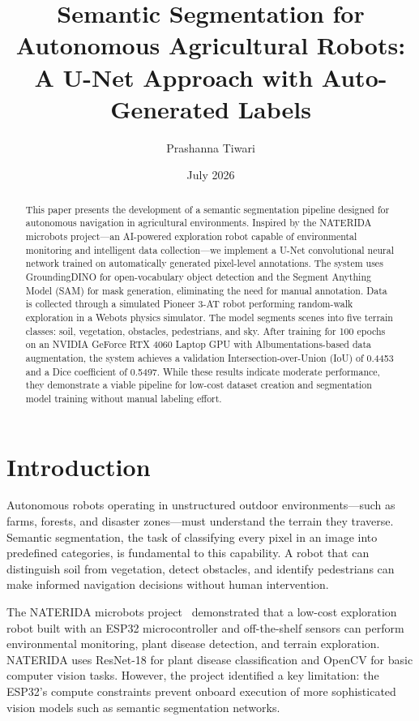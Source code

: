 \documentclass[12pt,a4paper]{article}
\title{Semantic Segmentation for Autonomous Agricultural Robots: \\
\large A U-Net Approach with Auto-Generated Labels}
\author{Prashanna Tiwari}
\date{July 2026}
\begin{document}
\maketitle

\begin{abstract}
This paper presents the development of a semantic segmentation pipeline designed for autonomous navigation in agricultural environments. Inspired by the NATERIDA microbots project---an AI-powered exploration robot capable of environmental monitoring and intelligent data collection---we implement a U-Net convolutional neural network trained on automatically generated pixel-level annotations. The system uses GroundingDINO for open-vocabulary object detection and the Segment Anything Model (SAM) for mask generation, eliminating the need for manual annotation. Data is collected through a simulated Pioneer 3-AT robot performing random-walk exploration in a Webots physics simulator. The model segments scenes into five terrain classes: soil, vegetation, obstacles, pedestrians, and sky. After training for 100 epochs on an NVIDIA GeForce RTX 4060 Laptop GPU with Albumentations-based data augmentation, the system achieves a validation Intersection-over-Union (IoU) of 0.4453 and a Dice coefficient of 0.5497. While these results indicate moderate performance, they demonstrate a viable pipeline for low-cost dataset creation and segmentation model training without manual labeling effort.
\end{abstract}

\tableofcontents
\newpage

\section{Introduction}
\label{sec:introduction}

Autonomous robots operating in unstructured outdoor environments---such as farms, forests, and disaster zones---must understand the terrain they traverse. Semantic segmentation, the task of classifying every pixel in an image into predefined categories, is fundamental to this capability. A robot that can distinguish soil from vegetation, detect obstacles, and identify pedestrians can make informed navigation decisions without human intervention.

The NATERIDA microbots project~\cite{naterida} demonstrated that a low-cost exploration robot built with an ESP32 microcontroller and off-the-shelf sensors can perform environmental monitoring, plant disease detection, and terrain exploration. NATERIDA uses ResNet-18 for plant disease classification and OpenCV for basic computer vision tasks. However, the project identified a key limitation: the ESP32's compute constraints prevent onboard execution of more sophisticated vision models such as semantic segmentation networks.
\end{document}
